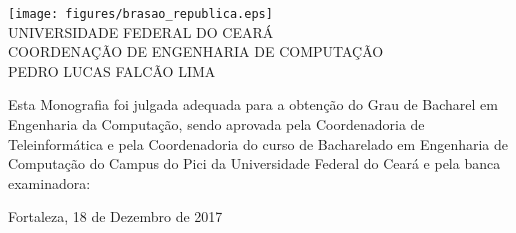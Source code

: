 \begin{folhadeaprovacao}
\setlength{\ABNTsignthickness}{0.2pt}
\setlength{\ABNTsignskip}{1.7cm}

\begin{center}
\texttt{[image: figures/brasao\_republica.eps]}\\

            {UNIVERSIDADE FEDERAL DO CEARÁ} \\
            {COORDENAÇÃO DE ENGENHARIA DE COMPUTAÇÃO}  \\

    \vspace{1.5cm}
                                    {PEDRO LUCAS FALCÃO LIMA}\\
    \bfseries{}
\end{center}

Esta Monografia foi julgada adequada para a obten\c{c}\~{a}o do Grau de Bacharel em Engenharia da Computação, sendo aprovada pela Coordenadoria de Teleinformática e pela Coordenadoria do curso de Bacharelado em Engenharia de Computação do Campus do Pici da Universidade Federal do Ceará e pela banca examinadora:

    \vspace{0.15cm}
    \vspace{0.15cm}%

    \begin{center}
        Fortaleza, 18 de Dezembro de 2017
    \end{center}
\end{folhadeaprovacao}